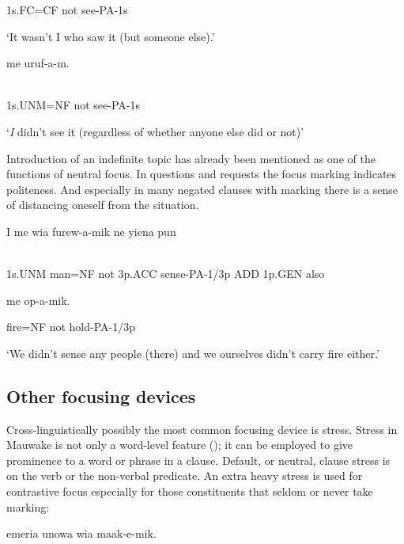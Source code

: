 1s.FC=CF  not  see-PA-1s

`It wasn't I who saw it (but someone else).'

\ea%
\label{ex:x1736}
\gll {}  me  uruf-a-m. \\
      \\
\glt
\z

1s.UNM=NF  not  see-PA-1s

`\textit{I}  didn't see it (regardless of whether anyone else did or not)'

Introduction of an indefinite topic has already been mentioned as one of the functions of neutral focus. In questions and requests the focus marking indicates politeness. And especially in many negated clauses with  marking there is a sense of distancing oneself from the situation. 

\ea%
\label{ex:x1738}
\gll I    me  wia  furew-a-mik  ne  yiena  pun  \\
      \\
\glt
\z

1s.UNM  man=NF  not  3p.ACC  sense-PA-1/3p  ADD  1p.GEN  also

  me  op-a-mik.

fire=NF  not  hold-PA-1/3p

`We didn't sense any people (there) and we ourselves didn't carry fire either.'

\subsection{Other focusing devices}
\hypertarget{RefHeading23961935131865}{}
Cross-linguistically possibly the most common focusing device is stress. Stress in Mauwake is not only a word-level feature (); it can be employed to give prominence to a word or phrase in a clause. Default, or neutral, clause stress is on the verb or the non-verbal predicate. An extra heavy stress is used for contrastive focus especially for those constituents that seldom or never take  marking:  

\ea%
\label{ex:x1739}
\gll {}\textstyleEmphasizedVernacularWords{{{\textprimstress}}}  emeria  unowa  wia  maak-e-mik. \\
      \\
\glt
\z

